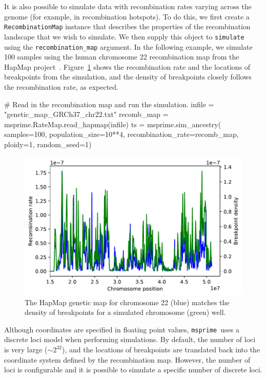 \documentclass[graybox]{svmult}
\newcommand{\msprime}[0]{\texttt{msprime}}
\begin{document}
It is also possible to simulate data with recombination rates varying
across the genome (for example, in recombination hotspots). To do this, we
first create a \texttt{RecombinationMap} instance that describes the
properties of the recombination landscape that we wish to simulate. We
then supply this object to \texttt{simulate} using the
\texttt{recombination\_map} argument. In the following example, we
simulate 100 samples using the human chromosome 22 recombination map
from the HapMap project~\citep{international2003international}.
Figure~\ref{fig:variable_recombination} shows the
recombination rate and the locations of breakpoints
from the simulation, and the density of breakpoints closely follows the
recombination rate, as expected.

\begin{pythoncode}
# Read in the recombination map and run the simulation.
infile = "genetic_map_GRCh37_chr22.txt"
recomb_map = msprime.RateMap.read_hapmap(infile)
ts = msprime.sim_ancestry(
    samples=100,
    population_size=10**4,
    recombination_rate=recomb_map,
    ploidy=1,
    random_seed=1)
\end{pythoncode}

\begin{figure}
\begin{center}
\includegraphics[width=\textwidth]{images/plot_11.pdf}
\end{center}
\caption{\label{fig:variable_recombination} The HapMap
genetic map for chromosome 22 (blue) matches the density of breakpoints for a simulated chromosome (green) well.}
\end{figure}

Although coordinates are specified in floating point values, \msprime\
uses a discrete loci model when performing simulations. By default, the
number of loci is very large (\(\sim 2^{32}\)), and the locations of
breakpoints are translated back into the coordinate system defined by
the recombination map. However, the number of loci is configurable and
it is possible to simulate a specific number of discrete
loci.
\end{document}
